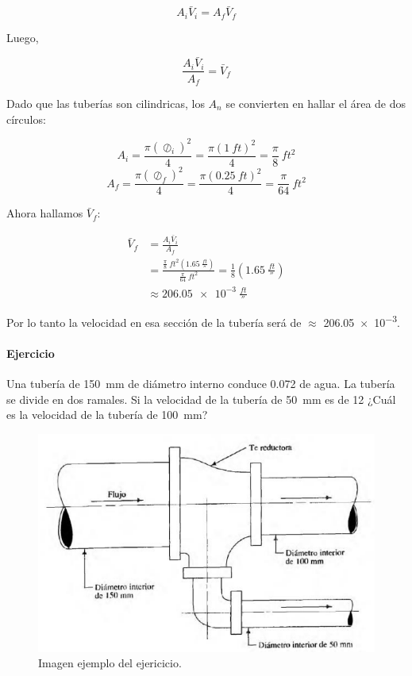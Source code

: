 \documentclass[]{article}
\begin{document}
\[ A_i \bar{V}_i = A_f \bar{V}_f \]

Luego,

\[ \frac{A_i \bar{V}_i} { A_f } = \bar{V}_f \]

Dado que las tuberías son cilindricas, los $A_n$ se convierten en hallar el área de dos círculos:

\[ A_i = \frac{\pi (\oslash_i)^2}{4} = \frac{\pi (\SI{1}{ft})^2}{4} = \frac{\pi}{8}\SI{}{ft^2} \]
\[ A_f = \frac{\pi (\oslash_f)^2}{4} = \frac{\pi (\SI{0,25}{ft})^2}{4} = \frac{\pi}{64}\SI{}{ft^2} \]

Ahora hallamos $\bar{V}_f$:

\begin{align*}
	\bar{V}_f &= \frac{A_i \bar{V}_i} { A_f }\\
	          &= \frac{\frac{\pi}{8}\SI{}{ft^2} (\SI{1,65}{\frac{ft}{\second}})} 
	                  {\frac{\pi}{64}\SI{}{ft^2}}
	           =  \frac{1}{8}\left(\SI{1,65}{\frac{ft}{\second}}\right)\\
	          &\approx \SI{206,05e-3}{\frac{ft}{\second}} 
\end{align*}

Por lo tanto la velocidad en esa sección de la tubería será de $\approx$ \SI{206,05e-3}{}.


\paragraph{Ejercicio}
Una tubería de \SI{150}{\milli\meter} de diámetro interno conduce \SI{0,072}{} de agua. La tubería se divide en dos ramales. Si la velocidad de la tubería de \SI{50}{\milli\meter} es de \SI{12}{\frac{\meter}{\second}} ¿Cuál es la velocidad de la tubería de \SI{100}{\milli\meter}?

\begin{figure}[h!]
	\centering
	\includegraphics[width=0.9\linewidth]{img/1.png}
	\caption{Imagen ejemplo del ejericicio.}
	\label{fig:io_1}
\end{figure}
\end{document}
